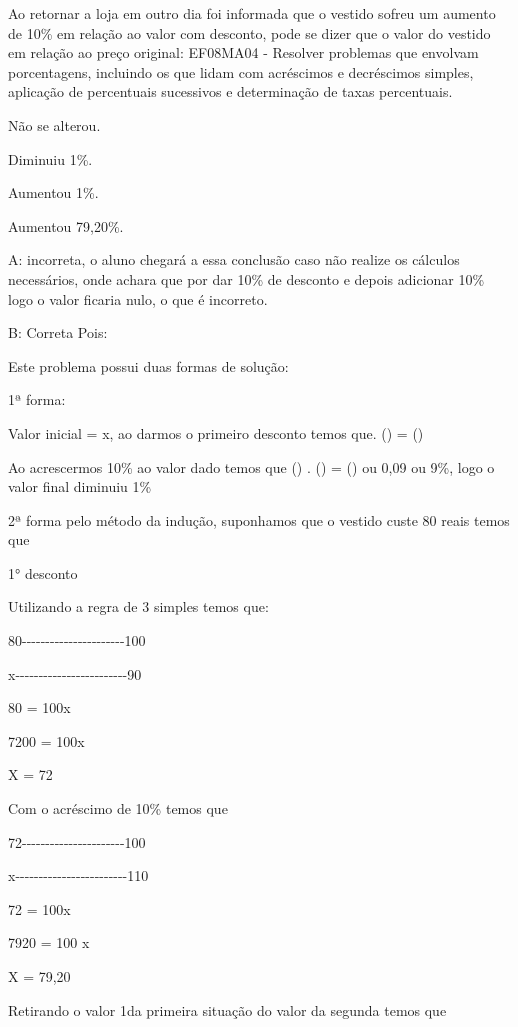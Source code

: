 Ao retornar a loja em outro dia foi informada que o vestido sofreu um
aumento de 10\% em relação ao valor com desconto, pode se dizer que o
valor do vestido em relação ao preço original: EF08MA04 - Resolver
problemas que envolvam porcentagens, incluindo os que lidam com
acréscimos e decréscimos simples, aplicação de percentuais sucessivos e
determinação de taxas percentuais.

\item Não se alterou.
\item Diminuiu 1\%.
\item Aumentou 1\%.
\item Aumentou 79,20\%.

A: incorreta, o aluno chegará a essa conclusão caso não realize os
cálculos necessários, onde achara que por dar 10\% de desconto e depois
adicionar 10\% logo o valor ficaria nulo, o que é incorreto.

B: Correta Pois:

Este problema possui duas formas de solução:

1ª forma:

Valor inicial = x, ao darmos o primeiro desconto temos que\times .
() = ()

Ao acrescermos 10\% ao valor dado temos que () .
() = () ou 0,09 ou 9\%, logo o valor final
diminuiu 1\%

2ª forma pelo método da indução, suponhamos que o vestido custe 80 reais
temos que

1° desconto

Utilizando a regra de 3 simples temos que:

80-\/-\/-\/-\/-\/-\/-\/-\/-\/-\/-\/-\/-\/-\/-\/-\/-\/-\/-\/-\/-\/-100

x-\/-\/-\/-\/-\/-\/-\/-\/-\/-\/-\/-\/-\/-\/-\/-\/-\/-\/-\/-\/-\/-\/-\/-90

80 = 100x

7200 = 100x

X = 72

Com o acréscimo de 10\% temos que

72-\/-\/-\/-\/-\/-\/-\/-\/-\/-\/-\/-\/-\/-\/-\/-\/-\/-\/-\/-\/-\/-100

x-\/-\/-\/-\/-\/-\/-\/-\/-\/-\/-\/-\/-\/-\/-\/-\/-\/-\/-\/-\/-\/-\/-\/-110

72 = 100x

7920 = 100 x

X = 79,20

Retirando o valor 1da primeira situação do valor da segunda temos que

